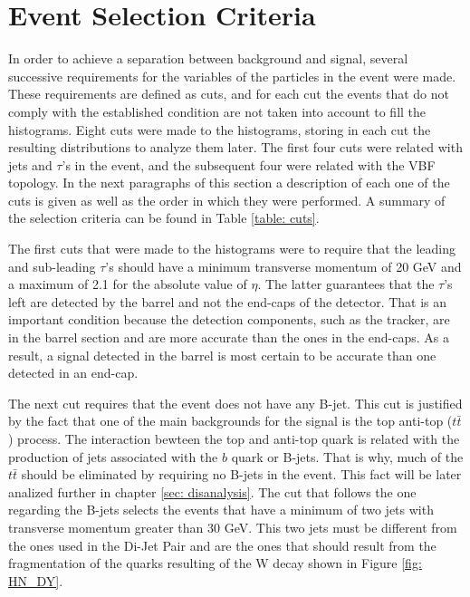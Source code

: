 \section{Event Selection Criteria}\label{sec: selectionCriteria}

In order to achieve a separation between background and signal, several successive requirements for the variables of the particles in the event were made. These requirements are defined as cuts, and for each cut the events that do not comply with the established condition are not taken into account to fill the histograms. Eight cuts were made to the histograms, storing in each cut the resulting distributions to analyze them later. The first four cuts were related with jets and $\tau$'s in the event, and the subsequent four were related with the VBF topology. In the next paragraphs of this section a description of each one of the cuts is given as well as the order in which they were performed. A summary of the selection criteria can be found in Table \ref{table: cuts}.

The first cuts that were made to the histograms were to require that the leading and sub-leading $\tau$'s should have a minimum transverse momentum of 20 GeV and a maximum of 2.1 for the absolute value of $\eta$. The latter guarantees that the $\tau$'s left are detected by the barrel and not the end-caps of the detector. That is an important condition because the detection components, such as the tracker, are in the barrel section and are more accurate than the ones in the end-caps. As a result, a signal detected in the barrel is most certain to be accurate than one detected in an end-cap.  

The next cut requires that the event does not have any B-jet. This cut is justified by the fact that one of the main backgrounds for the signal is the top anti-top ($t\bar{t}$) process. The interaction bewteen the top and anti-top quark is related with the production of jets associated with the $b$ quark or B-jets. That is why, much of the $t\bar{t}$ should be eliminated by requiring no B-jets in the event. This fact will be later analized further in chapter \ref{sec: disanalysis}. The cut that follows the one regarding the B-jets selects the events that have a minimum of two jets with transverse momentum greater than 30 GeV. This two jets must be different from the ones used in the Di-Jet Pair and are the ones that should result from the fragmentation of the quarks resulting of the W decay shown in Figure \ref{fig: HN_DY}.

